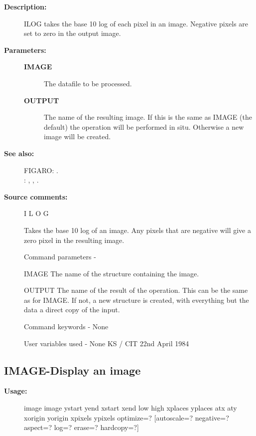 \begin{description}
\begin{description}
\item [\textbf{Description:}]
 ILOG takes the base 10 log of each pixel in an image.
 Negative pixels are set to zero in the output image.

\item [\textbf{Parameters:}]
\begin{description}
\item [\textbf{IMAGE}]
 The datafile to be processed.
\item [\textbf{OUTPUT}]
 The name of the resulting image.  If this is the
 same as IMAGE (the default) the operation will be
 performed in situ.  Otherwise a new image will be
 created.
\end{description}

\item [\textbf{See also:}]
FIGARO: .\\
: , , .\\

\item [\textbf{Source comments:}]
\begin{terminalv}
 I L O G

 Takes the base 10 log of an image.  Any pixels that are
 negative will give a zero pixel in the resulting image.

 Command parameters -

 IMAGE  The name of the structure containing the image.

 OUTPUT The name of the result of the operation.  This can
        be the same as for IMAGE.  If not, a new structure
        is created, with everything but the data a direct
        copy of the input.

 Command keywords  - None

 User variables used - None
                                  KS / CIT 22nd April 1984
\end{terminalv}
\end{description}
\subsection{IMAGE-\label{IMAGE}Display an image}
\begin{description}

\item [\textbf{Usage:}]
 image image ystart yend xstart xend low high xplaces yplaces
       atx aty xorigin yorigin xpixels ypixels optimize=?
       [autoscale=? negative=? aspect=? log=? erase=? hardcopy=?]


\end{description}
\end{description}
